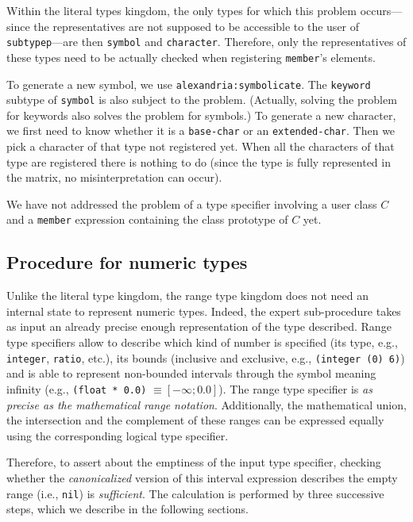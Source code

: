 \documentclass[format=sigconf]{acmart}
\newcommand\code[2][\small]{\sloppy\texttt{#1#2}}
\theoremstyle{definition}
\begin{document}
Within the literal types kingdom, the only types for which this problem
occurs---since the representatives are not supposed to be accessible to the user
of \code{subtypep}---are then \code{symbol} and \code{character}.
Therefore, only the representatives of these types need to be actually checked
when registering \code{member}'s elements.

To generate a new symbol, we use \code{alexandria:symbolicate}.
The \code{keyword} subtype of \code{symbol} is also subject to the problem.
(Actually, solving the problem for keywords also solves the problem for
symbols.)
To generate a new character, we first need to know whether it is a
\code{base-char} or an \code{extended-char}. Then we pick a character of that
type not registered yet. When all the characters of that type are registered
there is nothing to do (since the type is fully represented in the matrix, no
misinterpretation can occur).

We have not addressed the problem of a type
specifier involving a user class $C$ and a \code{member} expression containing
the class prototype of $C$ yet.


\subsection{Procedure for numeric types}
\label{sec:expnum}
Unlike the literal type kingdom, the range type kingdom does not need an
internal state to represent numeric types. Indeed, the expert sub-procedure
takes as input an already precise enough representation of the type described.
Range type specifiers allow to describe which kind of number is specified (its
type, e.g., \code{integer}, \code{ratio}, etc.), its bounds (inclusive and
exclusive, e.g., \code{(integer (0) 6)}) and is able to represent non-bounded
intervals through the symbol \code{*} meaning infinity (e.g., \code{(float *
  0.0)} $\equiv \left[-\infty; 0.0\right]$). The range type specifier is
\emph{as precise as the mathematical range notation}. Additionally, the
mathematical union, the intersection and the complement of these ranges can
be expressed equally using the corresponding logical type specifier.

Therefore, to assert about the emptiness of the input type specifier, checking
whether the \emph{canonicalized} version of this interval expression describes
the empty range (i.e., \code{nil}) is \emph{sufficient}.
The calculation is performed by three successive steps, which we describe in the
following sections.
\end{document}

